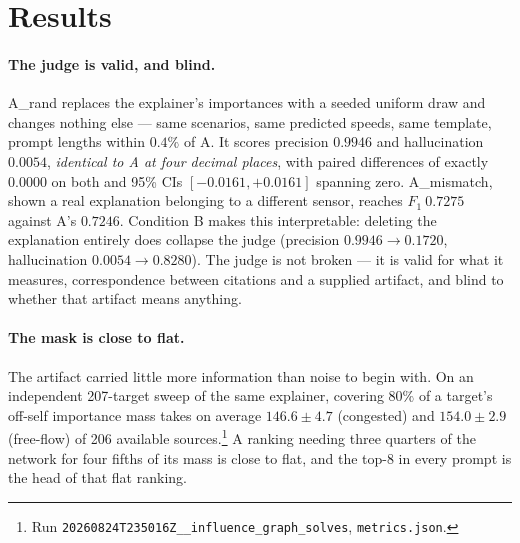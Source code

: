 \documentclass{article}
\begin{document}
\section{Results}

\paragraph{The judge is valid, and blind.} A\_rand replaces the explainer's
importances with a seeded uniform draw and changes nothing else --- same scenarios,
same predicted speeds, same template, prompt lengths within $0.4\%$ of A. It scores
precision $0.9946$ and hallucination $0.0054$, \emph{identical to A at four decimal
places}, with paired differences of exactly $0.0000$ on both and 95\% CIs
$[-0.0161, +0.0161]$ spanning zero. A\_mismatch, shown a real explanation belonging
to a different sensor, reaches $F_1\ 0.7275$ against A's $0.7246$. Condition B makes
this interpretable: deleting the explanation entirely does collapse the judge
(precision $0.9946 \to 0.1720$, hallucination $0.0054 \to 0.8280$). The judge is not
broken --- it is valid for what it measures, correspondence between citations and a
supplied artifact, and blind to whether that artifact means anything.

\paragraph{The mask is close to flat.} The artifact carried little more information
than noise to begin with. On an independent 207-target sweep of the same explainer,
covering $80\%$ of a target's off-self importance mass takes on average
$146.6\pm4.7$ (congested) and $154.0\pm2.9$ (free-flow) of 206 available
sources.\footnote{Run \texttt{20260824T235016Z\_\_influence\_\allowbreak graph\_solves},
\texttt{metrics.json}.} A ranking
needing three quarters of the network for four fifths of its mass is close to flat,
and the top-8 in every prompt is the head of that flat ranking.
\end{document}
